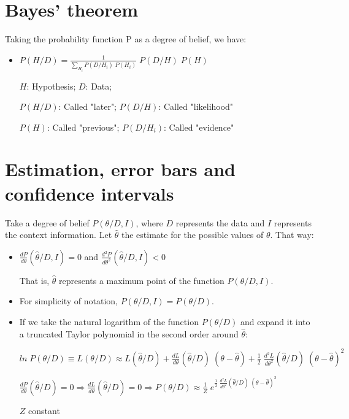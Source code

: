 \documentclass{article}
\begin{document}
\section{Bayes' theorem}

Taking the probability function P as a degree of belief, we have:

\begin{itemize}

\item $P(H/D) = \frac{1}{\sum\limits_{H_{i}} P(D/H_{i}) \; P(H_{i})} \; P(D/H) \; P(H)$

$H$: Hypothesis; $D$: Data;

$P(H/D)$: Called "later"; $P(D/H)$: Called "likelihood"

$P(H)$: Called "previous"; $P(D/H_{i})$: Called "evidence"

\end{itemize}

\section{Estimation, error bars and confidence intervals}

Take a degree of belief $P(\theta/D,I)$, where $D$ represents the data and $I$ represents the context information. Let $\hat{\theta}$ the estimate for the possible values of $\theta$. That way:

\begin{itemize}

\item $\frac{dP}{d\theta} (\hat{\theta}/D,I) = 0$ and $\frac{d^{2}P}{d\theta^{2}} (\hat{\theta}/D,I) < 0$

That is, $\hat{\theta}$ represents a maximum point of the function $P(\theta/D,I)$.

\item For simplicity of notation, $P(\theta/D,I) = P(\theta/D)$.

\item If we take the natural logarithm of the function $P(\theta/D)$ and expand it into a truncated Taylor polynomial in the second order around $\hat{\theta}$:

$ln \; P(\theta/D) \equiv L(\theta/D) \approx L(\hat{\theta}/D) + \frac{dL}{d\theta} (\hat{\theta}/D) \; (\theta - \hat{\theta}) + \frac{1}{2} \; \frac{d^{2}L}{d\theta^{2}} (\hat{\theta}/D) \; (\theta - \hat{\theta})^{2}$

$\frac{dP}{d\theta} (\hat{\theta}/D) = 0 \Rightarrow \frac{dL}{d\theta} (\hat{\theta}/D) = 0 \Rightarrow P(\theta/D) \approx \frac{1}{Z} \; e^{\frac{1}{2} \; \frac{d^{2}L}{d\theta^{2}} (\hat{\theta}/D) \; (\theta - \hat{\theta})^{2}}$

$Z$ constant

\end{itemize}
\end{document}
